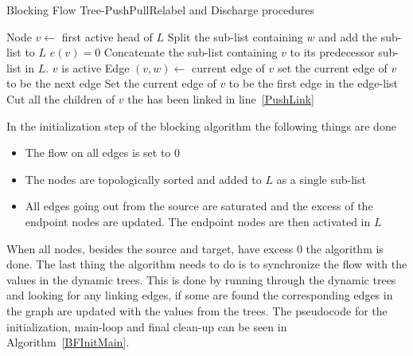 \begin{algorithm}
\caption{Blocking Flow Tree-PushPullRelabel and Discharge procedures}\label{BFPushPullRelabelDischarge}
\begin{algorithmic}[1]
\Statex
{}
	\State Node $v \gets$ first active head of $L$
	\Repeat
		\State {}
			\State Split the sub-list containing $w$ and add the sub-list to $L$
		\EndIf
	\Until $e(v) = 0 $
	\State Concatenate the sub-list containing $v$ to its predecessor sub-list in $L$.
\EndProcedure
\Statex
\Require $v$ is active
	\State Edge $(v,w) \gets$ current edge of $v$
		\State {}
		\State {}
			\State \label{PushLink} 
			\State {}
		\EndIf
		\State {}
		\State {}
			\State {}
			\State {}
		\EndIf		
	\Else
			\State set the current edge of $v$ to be the next edge
		\Else
			\State Set the current edge of $v$ to be the first edge in the edge-list
			\State Cut all the children of $v$ the has been linked in line~\ref{PushLink}
			\State {}
		\EndIf
	\EndIf
\EndProcedure
\end{algorithmic}
\end{algorithm}
In the initialization step of the blocking algorithm the following things are done
\begin{itemize}
	\item The flow on all edges is set to 0
	\item The nodes are topologically sorted and added to $L$ as a single sub-list
	\item All edges going out from the source are saturated and the excess of the endpoint nodes are updated. The endpoint nodes are then activated in $L$
\end{itemize}
When all nodes, besides the source and target, have excess 0 the algorithm is done. The last thing the algorithm needs to do is to synchronize the flow with the values in
the dynamic trees. This is done by running through the dynamic trees and looking for any linking edges, if some are found the corresponding edges in the graph
are updated with the values from the trees. The pseudocode for the initialization, main-loop and final clean-up can be seen in Algorithm~\ref{BFInitMain}.

